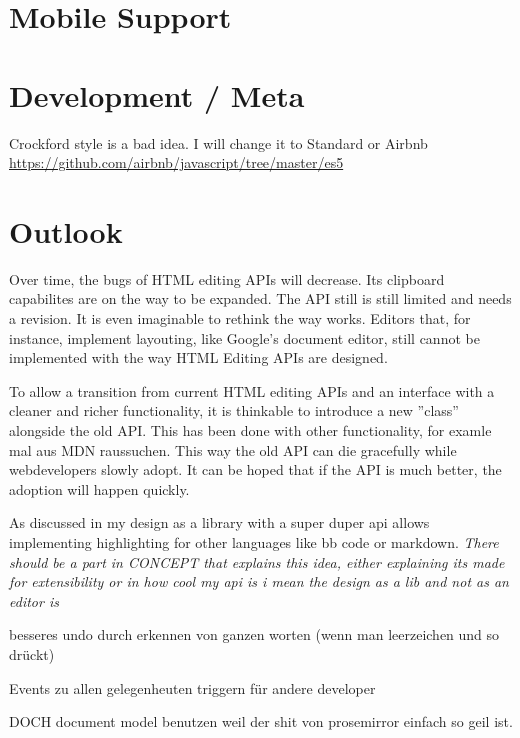 

\section{Mobile Support}
\section{Development / Meta}
Crockford style is a bad idea. 
I will change it to Standard or Airbnb 
\url{https://github.com/airbnb/javascript/tree/master/es5}


\section{Outlook}

Over time, the bugs of HTML editing APIs will decrease. Its clipboard capabilites are on the way to be expanded. The API still is still limited and needs a revision. It is even imaginable to rethink the way  works. Editors that, for instance, implement layouting, like Google's document editor, still cannot be implemented with the way HTML Editing APIs are designed.

To allow a transition from current HTML editing APIs and an interface with a cleaner and richer functionality, it is thinkable to introduce a new ''class'' alongside the old API. This has been done with other functionality, for examle mal aus MDN raussuchen. This way the old API can die gracefully while webdevelopers slowly adopt. It can be hoped that if the API is much better, the adoption will happen quickly.


As discussed in  my design as a library with a super duper api allows implementing highlighting for other languages like bb code or markdown. \textit{There should be a part in CONCEPT that explains this idea, either explaining its made for extensibility or in how cool my api is i mean the design as a lib and not as an editor is}


besseres undo durch erkennen von ganzen worten (wenn man leerzeichen und so drückt)

Events zu allen gelegenheuten triggern für andere developer


DOCH document model benutzen weil der shit von prosemirror einfach so geil ist.